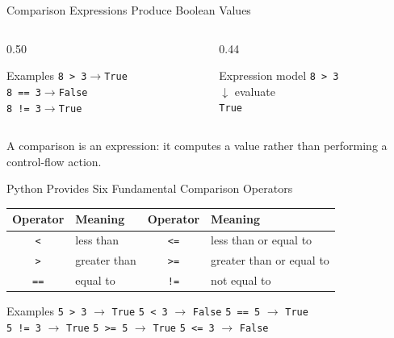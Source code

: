 \documentclass[aspectratio=169,10pt]{beamer}
\begin{document}
\begin{frame}{Comparison Expressions Produce Boolean Values}
  \begin{columns}[T,onlytextwidth]
    \begin{column}{0.50\textwidth}
      \begin{block}{Examples}
        \texttt{8 > 3}\hfill$\longrightarrow$\hfill\texttt{True}\\[0.08in]
        \texttt{8 == 3}\hfill$\longrightarrow$\hfill\texttt{False}\\[0.08in]
        \texttt{8 != 3}\hfill$\longrightarrow$\hfill\texttt{True}
      \end{block}
    \end{column}

    \begin{column}{0.44\textwidth}
      \begin{block}{Expression model}
        \centering
        \texttt{8 > 3}\\[0.08in]
        $\downarrow$ evaluate\\[0.08in]
        \texttt{True}
      \end{block}
    \end{column}
  \end{columns}

  \begin{keyidea}
    A comparison is an expression: it computes a value rather than performing a control-flow action.
  \end{keyidea}
\end{frame}

\begin{frame}{Python Provides Six Fundamental Comparison Operators}
  \begin{center}
    \renewcommand{\arraystretch}{1.35}
    \begin{tabular}{c|l@{\qquad}c|l}
      \textbf{Operator} & \textbf{Meaning} & \textbf{Operator} & \textbf{Meaning} \\\hline
      \texttt{<} & less than & \texttt{<=} & less than or equal to \\
      \texttt{>} & greater than & \texttt{>=} & greater than or equal to \\
      \texttt{==} & equal to & \texttt{!=} & not equal to
    \end{tabular}
  \end{center}

  \vspace{0.16in}

  \begin{block}{Examples}
    \texttt{5 > 3} $\rightarrow$ \texttt{True}\qquad
    \texttt{5 < 3} $\rightarrow$ \texttt{False}\qquad
    \texttt{5 == 5} $\rightarrow$ \texttt{True}\\[0.08in]
    \texttt{5 != 3} $\rightarrow$ \texttt{True}\qquad
    \texttt{5 >= 5} $\rightarrow$ \texttt{True}\qquad
    \texttt{5 <= 3} $\rightarrow$ \texttt{False}
  \end{block}
\end{frame}
\end{document}
